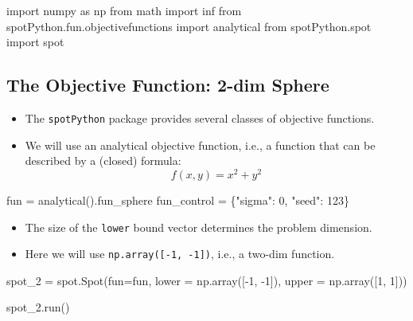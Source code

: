\documentclass[
  letterpaper,
  DIV=11,
  numbers=noendperiod]{scrreprt}
\newenvironment{Shaded}{\begin{snugshade}}{\end{snugshade}}
\newcommand{\DecValTok}[1]{\textcolor[rgb]{0.68,0.00,0.00}{#1}}
\newcommand{\ImportTok}[1]{\textcolor[rgb]{0.00,0.46,0.62}{#1}}
\newcommand{\NormalTok}[1]{\textcolor[rgb]{0.00,0.23,0.31}{#1}}
\newcommand{\OperatorTok}[1]{\textcolor[rgb]{0.37,0.37,0.37}{#1}}
\newcommand{\StringTok}[1]{\textcolor[rgb]{0.13,0.47,0.30}{#1}}
\providecommand{\tightlist}{%
  \setlength{\itemsep}{0pt}\setlength{\parskip}{0pt}}\usepackage{longtable,booktabs,array}
\begin{document}
\begin{Shaded}
\begin{Highlighting}[]
\ImportTok{import}\NormalTok{ numpy }\ImportTok{as}\NormalTok{ np}
\ImportTok{from}\NormalTok{ math }\ImportTok{import}\NormalTok{ inf}
\ImportTok{from}\NormalTok{ spotPython.fun.objectivefunctions }\ImportTok{import}\NormalTok{ analytical}
\ImportTok{from}\NormalTok{ spotPython.spot }\ImportTok{import}\NormalTok{ spot}
\end{Highlighting}
\end{Shaded}

\hypertarget{the-objective-function-2-dim-sphere}{%
\subsection{The Objective Function: 2-dim
Sphere}\label{the-objective-function-2-dim-sphere}}

\begin{itemize}
\tightlist
\item
  The \texttt{spotPython} package provides several classes of objective
  functions.
\item
  We will use an analytical objective function, i.e., a function that
  can be described by a (closed) formula: \[f(x, y) = x^2 + y^2\]
\end{itemize}

\begin{Shaded}
\begin{Highlighting}[]
\NormalTok{fun }\OperatorTok{=}\NormalTok{ analytical().fun\_sphere}
\NormalTok{fun\_control }\OperatorTok{=}\NormalTok{ \{}\StringTok{"sigma"}\NormalTok{: }\DecValTok{0}\NormalTok{,}
               \StringTok{"seed"}\NormalTok{: }\DecValTok{123}\NormalTok{\}}
\end{Highlighting}
\end{Shaded}

\begin{itemize}
\tightlist
\item
  The size of the \texttt{lower} bound vector determines the problem
  dimension.
\item
  Here we will use \texttt{np.array({[}-1,\ -1{]})}, i.e., a two-dim
  function.
\end{itemize}

\begin{Shaded}
\begin{Highlighting}[]
\NormalTok{spot\_2 }\OperatorTok{=}\NormalTok{ spot.Spot(fun}\OperatorTok{=}\NormalTok{fun,}
\NormalTok{                   lower }\OperatorTok{=}\NormalTok{ np.array([}\OperatorTok{{-}}\DecValTok{1}\NormalTok{, }\OperatorTok{{-}}\DecValTok{1}\NormalTok{]),}
\NormalTok{                   upper }\OperatorTok{=}\NormalTok{ np.array([}\DecValTok{1}\NormalTok{, }\DecValTok{1}\NormalTok{]))}

\NormalTok{spot\_2.run()}
\end{Highlighting}
\end{Shaded}
\end{document}
